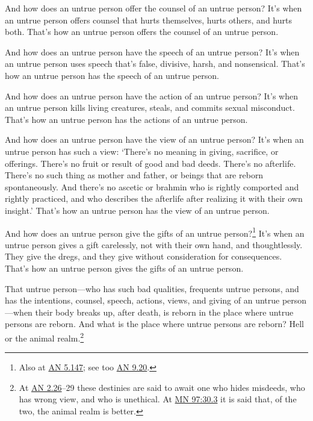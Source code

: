 \documentclass[12pt,openany]{book}%
\begin{document}
And how does an untrue person offer the counsel of an untrue person? It’s when an untrue person offers counsel that hurts themselves, hurts others, and hurts both. That’s how an untrue person offers the counsel of an untrue person. 

And how does an untrue person have the speech of an untrue person? It’s when an untrue person uses speech that’s false, divisive, harsh, and nonsensical. That’s how an untrue person has the speech of an untrue person. 

And how does an untrue person have the action of an untrue person? It’s when an untrue person kills living creatures, steals, and commits sexual misconduct. That’s how an untrue person has the actions of an untrue person. 

And how does an untrue person have the view of an untrue person? It’s when an untrue person has such a view: ‘There’s no meaning in giving, sacrifice, or offerings. There’s no fruit or result of good and bad deeds. There’s no afterlife. There’s no such thing as mother and father, or beings that are reborn spontaneously. And there’s no ascetic or brahmin who is rightly comported and rightly practiced, and who describes the afterlife after realizing it with their own insight.’ That’s how an untrue person has the view of an untrue person. 

And how does an untrue person give the gifts of an untrue person?\footnote{Also at \href{https://suttacentral.net/an5.147/en/sujato}{AN 5.147}; see too \href{https://suttacentral.net/an9.20/en/sujato}{AN 9.20}. } It’s when an untrue person gives a gift carelessly, not with their own hand, and thoughtlessly. They give the dregs, and they give without consideration for consequences. That’s how an untrue person gives the gifts of an untrue person. 

That untrue person—who has such bad qualities, frequents untrue persons, and has the intentions, counsel, speech, actions, views, and giving of an untrue person—when their body breaks up, after death, is reborn in the place where untrue persons are reborn. And what is the place where untrue persons are reborn? Hell or the animal realm.\footnote{At \href{https://suttacentral.net/an2.26/en/sujato}{AN 2.26}–29 these destinies are said to await one who hides misdeeds, who has wrong view, and who is unethical. At \href{https://suttacentral.net/mn97/en/sujato\#30.3}{MN 97:30.3} it is said that, of the two, the animal realm is better. } 
\end{document}
